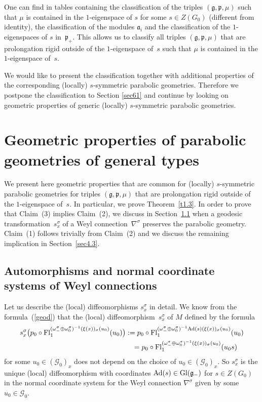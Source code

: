 \documentclass[pdftex]{sigma}
\newcommand{\om}{\omega}
\newcommand{\si}{\sigma}
\newcommand{\ba}{\mathcal{G}}
\newcommand{\fg}{\mathfrak g}
\newcommand{\fp}{\mathfrak p}
\newcommand{\Ad}{{\rm Ad}}
\newcommand{\Fl}{{\rm Fl}}
\numberwithin{equation}{section}
\begin{document}
One can f\/ind in \cite[Appendix C]{GZ3} tables containing the classif\/ication of the triples $(\fg,\fp,\mu)$ such that $\mu$ is contained in the $1$-eigenspace of $s$ for some $s\in Z(G_0)$ (dif\/ferent from identity), the classif\/ication of the modules $\mathfrak{a}_i$ and the classif\/ication of the $1$-eigenspaces of $s$ in~$\fp_+$. This allows us to classify all triples $(\fg,\fp,\mu)$ that are prolongation rigid outside of the $1$-eigenspace of~$s$ such that $\mu$ is contained in the $1$-eigenspace of~$s$.

We would like to present the classif\/ication together with additional properties of the corresponding (locally) $s$-symmetric parabolic geometries. Therefore we postpone the classif\/ication to Section \ref{sec61} and continue by looking on geometric properties of generic (locally) $s$-symmetric parabolic geometries.

\section{Geometric properties of parabolic geometries of general types} \label{sec3}
We present here geometric properties that are common for (locally) $s$-symmetric parabolic geometries for triples $(\fg,\fp,\mu)$ that are prolongation rigid outside of the $1$-eigenspace of~$s$. In particular, we prove Theorem~\ref{t1.3}. In order to prove that Claim~(3) implies Claim~(2), we discuss in Section~\ref{sec4.1} when a geodesic transformation~$s_x^\si$ of a Weyl connection~$\nabla^\si$ preserves the parabolic geometry. Claim~(1) follows trivially from Claim~(2) and we discuss the remaining implication in Section~\ref{sec4.3}.

\subsection{Automorphisms and normal coordinate systems of Weyl connections}\label{sec4.1}

Let us describe the (local) dif\/feomorphisms $s_x^\si$ in detail. We know from the formula~(\ref{geod}) that the (local) dif\/feomor\-phism~$s^{\si}_x$ of $M$ def\/ined by the formula
\begin{gather}
s^{\si}_x\big(p_0 \circ \Fl^{(\om_-^\si\oplus\om_{0}^\si)^{-1}(\xi(x))_\si(u_0)}_1(u_0)\big): = p_0 \circ \Fl^{(\om_-^\si\oplus\om_{0}^\si)^{-1}\Ad(s)(\xi(x))_\si(u_0)}_1(u_0)\nonumber\\
\hphantom{s^{\si}_x\big(p_0 \circ \Fl^{(\om_-^\si\oplus\om_{0}^\si)^{-1}(\xi(x))_\si(u_0)}_1(u_0)\big)}{}
= p_0 \circ \Fl^{(\om_-^\si\oplus\om_{0}^\si)^{-1}(\xi(x))_\si(u_0)}_1(u_0s)\label{geodf}
\end{gather}
for some $u_0\in (\ba_0)_x$ does not depend on the choice of $u_0\in (\ba_0)_x$. So $s_x^\si$ is the unique (local) dif\/feomorphism with coordinates $\Ad(s)\in {\rm Gl}(\fg_-)$ for $s\in Z(G_0)$ in the normal coordinate system for the Weyl connection $\nabla^\si$ given by some~$u_0\in \ba_0$.
\end{document}
